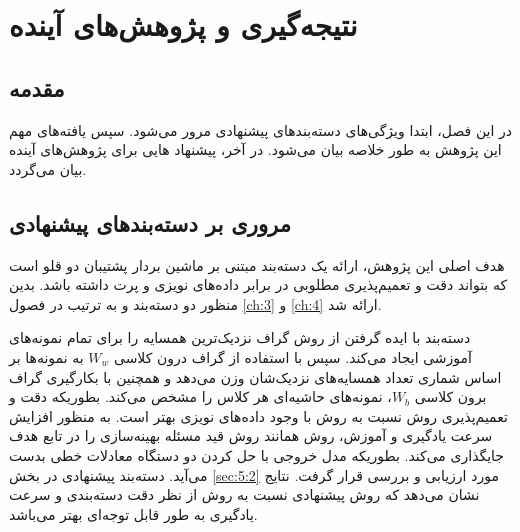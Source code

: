 
\chapter{نتیجه‌گیری و پژوهش‌های آینده}\label{ch:6}

\section{مقدمه}\label{sec:6:1}
در این فصل، ابتدا ویژگی‌های دسته‌بندهای پیشنهادی مرور می‌شود. سپس یافته‌های مهم این پژوهش به طور خلاصه بیان می‌شود. در آخر، پیشنهاد هایی برای پژوهش‌های آینده بیان می‌گردد.

\section{مروری بر دسته‌بندهای پیشنهادی}\label{sec:6:2}
هدف اصلی این پژوهش، ارائه یک دسته‌بند مبتنی بر ماشین بردار پشتیبان دو قلو است که بتواند دقت و تعمیم‌پذیری مطلوبی در برابر داده‌های نویزی و پرت داشته باشد. بدین منظور دو دسته‌بند  و  به ترتیب در فصول \ref{ch:3} و \ref{ch:4} ارائه شد.

دسته‌بند  \cite{mir2018} با ایده گرفتن از روش  گراف نزدیک‌ترین همسایه را برای تمام نمونه‌های آموزشی ایجاد می‌کند. سپس با استفاده از گراف درون کلاسی $W_{w}$ به نمونه‌ها بر اساس شماری تعداد همسایه‌های نزدیک‌شان وزن می‌دهد و همچنین با بکارگیری گراف برون کلاسی $W_{b}$، نمونه‌های حاشیه‌ای هر کلاس را مشخص می‌کند. بطوریکه دقت و تعمیم‌پذیری روش  نسبت به روش  با وجود داده‌های نویزی بهتر است. به منظور افزایش سرعت یادگیری و آموزش، روش  همانند روش  قید مسئله بهینه‌سازی را در تابع هدف جایگذاری می‌کند. بطوریکه مدل خروجی با حل کردن دو دستگاه معادلات خطی بدست می‌آید. دسته‌بند پیشنهادی در بخش \ref{sec:5:2} مورد ارزیابی و بررسی قرار گرفت. نتایج نشان می‌دهد که روش پیشنهادی نسبت به روش  از نظر دقت دسته‌بندی و سرعت یادگیری به طور قابل توجه‌ای بهتر می‌باشد.

